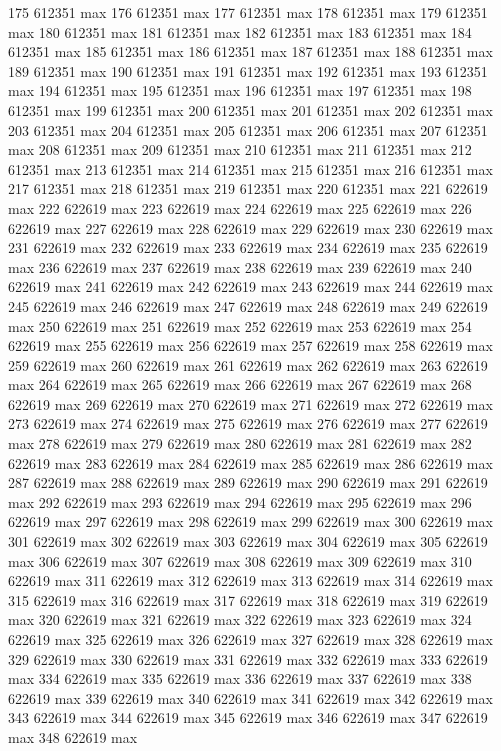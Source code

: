 {175 612351 max
176 612351 max
177 612351 max
178 612351 max
179 612351 max
180 612351 max
181 612351 max
182 612351 max
183 612351 max
184 612351 max
185 612351 max
186 612351 max
187 612351 max
188 612351 max
189 612351 max
190 612351 max
191 612351 max
192 612351 max
193 612351 max
194 612351 max
195 612351 max
196 612351 max
197 612351 max
198 612351 max
199 612351 max
200 612351 max
201 612351 max
202 612351 max
203 612351 max
204 612351 max
205 612351 max
206 612351 max
207 612351 max
208 612351 max
209 612351 max
210 612351 max
211 612351 max
212 612351 max
213 612351 max
214 612351 max
215 612351 max
216 612351 max
217 612351 max
218 612351 max
219 612351 max
220 612351 max
221 622619 max
222 622619 max
223 622619 max
224 622619 max
225 622619 max
226 622619 max
227 622619 max
228 622619 max
229 622619 max
230 622619 max
231 622619 max
232 622619 max
233 622619 max
234 622619 max
235 622619 max
236 622619 max
237 622619 max
238 622619 max
239 622619 max
240 622619 max
241 622619 max
242 622619 max
243 622619 max
244 622619 max
245 622619 max
246 622619 max
247 622619 max
248 622619 max
249 622619 max
250 622619 max
251 622619 max
252 622619 max
253 622619 max
254 622619 max
255 622619 max
256 622619 max
257 622619 max
258 622619 max
259 622619 max
260 622619 max
261 622619 max
262 622619 max
263 622619 max
264 622619 max
265 622619 max
266 622619 max
267 622619 max
268 622619 max
269 622619 max
270 622619 max
271 622619 max
272 622619 max
273 622619 max
274 622619 max
275 622619 max
276 622619 max
277 622619 max
278 622619 max
279 622619 max
280 622619 max
281 622619 max
282 622619 max
283 622619 max
284 622619 max
285 622619 max
286 622619 max
287 622619 max
288 622619 max
289 622619 max
290 622619 max
291 622619 max
292 622619 max
293 622619 max
294 622619 max
295 622619 max
296 622619 max
297 622619 max
298 622619 max
299 622619 max
300 622619 max
301 622619 max
302 622619 max
303 622619 max
304 622619 max
305 622619 max
306 622619 max
307 622619 max
308 622619 max
309 622619 max
310 622619 max
311 622619 max
312 622619 max
313 622619 max
314 622619 max
315 622619 max
316 622619 max
317 622619 max
318 622619 max
319 622619 max
320 622619 max
321 622619 max
322 622619 max
323 622619 max
324 622619 max
325 622619 max
326 622619 max
327 622619 max
328 622619 max
329 622619 max
330 622619 max
331 622619 max
332 622619 max
333 622619 max
334 622619 max
335 622619 max
336 622619 max
337 622619 max
338 622619 max
339 622619 max
340 622619 max
341 622619 max
342 622619 max
343 622619 max
344 622619 max
345 622619 max
346 622619 max
347 622619 max
348 622619 max
}
